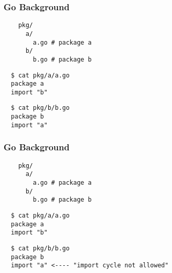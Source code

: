 
{
  \color{solarizedBase2}
\begin{frame}[fragile]
  \frametitle{Go Background}

  \begin{verbatim}
    pkg/
      a/
        a.go # package a
      b/
        b.go # package b
  \end{verbatim}

  \begin{verbatim}
  $ cat pkg/a/a.go
  package a
  import "b"
  \end{verbatim}

  \begin{verbatim}
  $ cat pkg/b/b.go
  package b
  import "a"
  \end{verbatim}

\end{frame}
}

{
  \color{solarizedBase2}
\begin{frame}[fragile]
  \frametitle{Go Background}

  \begin{verbatim}
    pkg/
      a/
        a.go # package a
      b/
        b.go # package b
  \end{verbatim}

  \begin{verbatim}
  $ cat pkg/a/a.go
  package a
  import "b"
  \end{verbatim}

  \begin{verbatim}
  $ cat pkg/b/b.go
  package b
  import "a" <---- "import cycle not allowed"
  \end{verbatim}

\end{frame}
}

